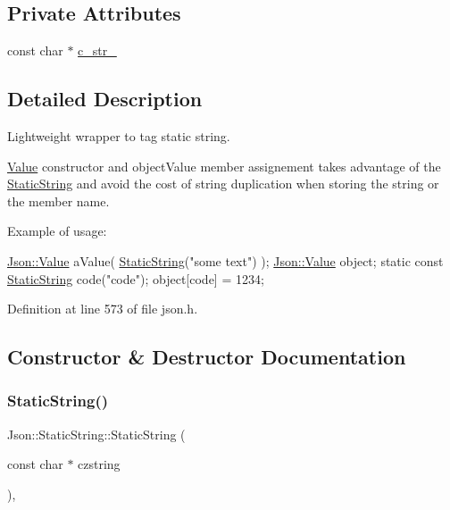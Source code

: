 \subsection*{Private Attributes}
\begin{DoxyCompactItemize}
\item 
const char $\ast$ \hyperlink{class_json_1_1_static_string_a9f0d9e8caee8f8db14e2c8c24760dffd}{c\+\_\+str\+\_\+}
\end{DoxyCompactItemize}


\subsection{Detailed Description}
Lightweight wrapper to tag static string. 

\hyperlink{class_json_1_1_value}{Value} constructor and object\+Value member assignement takes advantage of the \hyperlink{class_json_1_1_static_string}{Static\+String} and avoid the cost of string duplication when storing the string or the member name.

Example of usage\+: 
\begin{DoxyCode}
\hyperlink{class_json_1_1_value}{Json::Value} aValue( \hyperlink{class_json_1_1_static_string_afb6baf1ec078ce76f0b0f9b39d19437f}{StaticString}(\textcolor{stringliteral}{"some text"}) );
\hyperlink{class_json_1_1_value}{Json::Value} object;
\textcolor{keyword}{static} \textcolor{keyword}{const} \hyperlink{class_json_1_1_static_string_afb6baf1ec078ce76f0b0f9b39d19437f}{StaticString} code(\textcolor{stringliteral}{"code"});
\textcolor{keywordtype}{object}[code] = 1234;
\end{DoxyCode}
 

Definition at line 573 of file json.\+h.



\subsection{Constructor \& Destructor Documentation}
\mbox{\label{class_json_1_1_static_string_afb6baf1ec078ce76f0b0f9b39d19437f}} 
\subsubsection{\texorpdfstring{Static\+String()}{StaticString()}}
{\footnotesize\ttfamily Json\+::\+Static\+String\+::\+Static\+String (\begin{DoxyParamCaption}\item[{const char $\ast$}]{czstring }\end{DoxyParamCaption})\hspace{0.3cm}{\ttfamily [inline]}, {\ttfamily [explicit]}}



